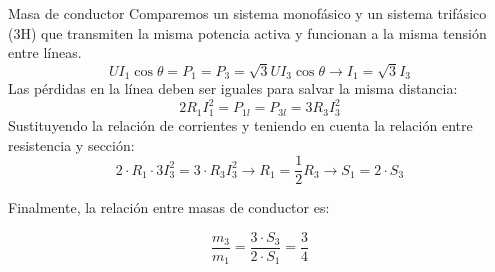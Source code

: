 \documentclass[aspectratio=169, usenames,svgnames,dvipsnames]{beamer}
\begin{document}
\begin{frame}[label={sec:orgb763435}]{Masa de conductor}
Comparemos un sistema monofásico y un sistema trifásico (3H) que transmiten la \alert{misma potencia activa} y funcionan a la \alert{misma tensión entre líneas}.
\[
U I_1 \cos\theta = P_1 = P_3 = \sqrt{3}U I_3 \cos\theta \rightarrow \boxed{I_1 = \sqrt{3} I_3}
\]
Las \alert{pérdidas en la línea} deben ser \alert{iguales} para salvar la \alert{misma distancia}:
\[
  2R_1I_1^2 = P_{1l} = P_{3l} = 3R_3I_3^2
\]
Sustituyendo la relación de corrientes y teniendo en cuenta la relación entre resistencia y sección:
\[
  2\cdot R_1 \cdot 3I_3^2 = 3\cdot R_3 I_3^2 \rightarrow R_1 = \frac{1}{2} R_3 \rightarrow \boxed{S_1 = 2 \cdot S_3}
\]

Finalmente, la relación entre masas de conductor es:

\[
  \frac{m_3}{m_1} = \frac{3 \cdot S_3}{2 \cdot S_1} = \boxed{\frac{3}{4}}
\]
\end{frame}
\end{document}
